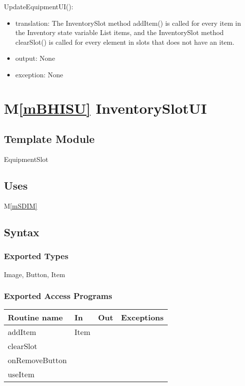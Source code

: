 \documentclass[12pt]{article}
\newcommand{\mref}[1]{M\ref{#1}}
\begin{document}
\noindent UpdateEquipmentUI():
\begin{itemize}
\item translation: The InventorySlot method addItem() is called for every item in the Inventory state variable List items, and the InventorySlot method clearSlot() is called for every element in slots that does not have an item.
\item output: None
\item exception: None
\end{itemize}

\newpage

\section* {\mref{mBHISU} InventorySlotUI}

\subsection*{Template Module}

EquipmentSlot

\subsection* {Uses}

\mref{mSDIM}

\subsection* {Syntax}

\subsubsection* {Exported Types}

Image, Button, Item

\subsubsection* {Exported Access Programs}

\begin{tabular}{| l | l | l | l |}
\hline
\textbf{Routine name} & \textbf{In} & \textbf{Out} & \textbf{Exceptions}\\
\hline
addItem & Item & ~  & ~\\
clearSlot & ~ & ~ & ~\\
onRemoveButton & ~ & ~ & ~\\
useItem & ~ & ~ & ~\\
\hline
\end{tabular}
\end{document}
